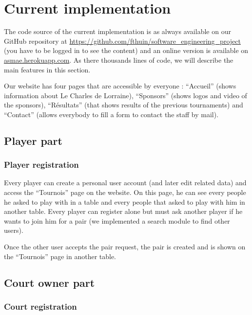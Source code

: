 \section{Current implementation}

The code source of the current implementation is as always available on our GitHub repository at \url{https://github.com/fthuin/software_engineering_project} (you have to be logged in to see the content) and an online version is available on \url{asmae.herokuapp.com}. As there thousands lines of code, we will describe the main features in this section.\newline

Our website has four pages that are accessible by everyone : \enquote{Accueil} (shows information about Le Charles de Lorraine), \enquote{Sponsors} (shows logos and video of the sponsors), \enquote{Résultats} (that shows results of the previous tournaments) and \enquote{Contact} (allows everybody to fill a form to contact the staff by mail).

\subsection{Player part}

\subsubsection{Player registration}

Every player can create a personal user account (and later edit related data) and access the \enquote{Tournois} page on the website. On this page, he can see every people he asked to play with in a table and every people that asked to play with him in another table. Every player can register alone but must ask another player if he wants to join him for a pair (we implemented a search module to find other users).

Once the other user accepts the pair request, the pair is created and is shown on the \enquote{Tournois} page in another table.

\subsection{Court owner part}

\subsubsection{Court registration}


